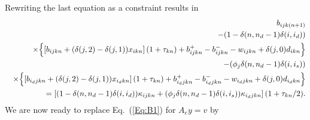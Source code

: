 \documentclass{article}[fleqn,12pt]
\begin{document}
Rewriting the last equation as a constraint results in
\begin{eqnarray}
	&&b_{ijk(n+1)} 
	  \nonumber  \\
	&& - (1 - \delta(n, n_d-1)\delta(i, i_d)) \nonumber\\
	&& \times \Bigl\{ \left[b_{ijkn} + (\delta(j, 2) - \delta(j, 1))x_{ikn}\right](1 + \tau_{kn}) + b^+_{ijkn} - b^-_{ijkn} - w_{ijkn} + \delta(j, 0)d_{ikn} \Bigr\}
	\nonumber \\
	&&- (\phi_j\delta(n, n_d-1)\delta(i, i_s)) \nonumber \\
	&& \times \Bigl\{ \left[b_{i_djkn} + (\delta(j, 2) - \delta(j, 1))x_{i_dkn}\right](1 + \tau_{kn}) + b^+_{i_djkn} - b^-_{i_djkn} - w_{i_djkn} + \delta(j, 0)d_{i_dkn} \Bigr\}
	\nonumber \\
	&&= \left[ (1 - \delta(n, n_d-1)\delta(i, i_d)) 
	\kappa_{ijkn} + (\phi_j\delta(n, n_d-1)\delta(i, i_s))
	\kappa_{i_djkn}\right](1 + \tau_{kn}/2). \nonumber  \\
\end{eqnarray}
We are now ready to replace Eq.~(\ref{Eq:B1}) for $A_ey = v$ by
\end{document}
